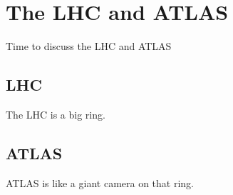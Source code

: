 \chapter{The LHC and ATLAS}\label{chapter:experiment}

Time to discuss the LHC and ATLAS

\section{LHC}

The LHC is a big ring.

\section{ATLAS}

ATLAS is like a giant camera on that ring.
